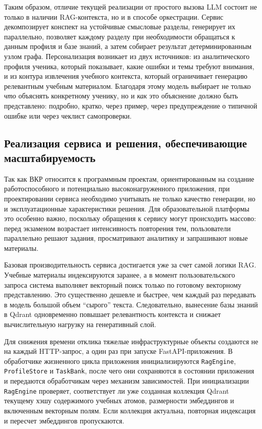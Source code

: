 \documentclass[a4paper,12pt]{extarticle}
\begin{document}
Таким образом, отличие текущей реализации от простого вызова LLM состоит не только
в наличии RAG-контекста, но и в способе оркестрации. Сервис декомпозирует конспект
на устойчивые смысловые разделы, генерирует их параллельно, позволяет каждому
разделу при необходимости обращаться к данным профиля и базе знаний, а затем
собирает результат детерминированным узлом графа. Персонализация возникает из
двух источников: из аналитического профиля ученика, который показывает, какие
ошибки и темы требуют внимания, и из контура извлечения учебного контекста, который ограничивает
генерацию релевантным учебным материалом. Благодаря этому модель выбирает не
только \textit{что} объяснять конкретному ученику, но и \textit{как} это
объяснение должно быть представлено: подробно, кратко, через пример, через
предупреждение о типичной ошибке или через чеклист самопроверки.

\subsection{Реализация сервиса и решения, обеспечивающие масштабируемость}

Так как ВКР относится к программным проектам, ориентированным на создание 
работоспособного и потенциально высоконагруженного приложения, при проектировании 
сервиса необходимо учитывать не только качество генерации, но и эксплуатационные 
характеристики решения. Для образовательной платформы это особенно важно, 
поскольку обращения к сервису могут происходить массово: перед экзаменом возрастает 
интенсивность повторения тем, пользователи параллельно решают задания, просматривают 
аналитику и запрашивают новые материалы.

Базовая производительность сервиса достигается уже за счет самой логики RAG. Учебные 
материалы индексируются заранее, а в момент пользовательского запроса система выполняет 
векторный поиск только по готовому векторному представлению. Это существенно дешевле и быстрее, 
чем каждый раз передавать в модель большой объем ``сырого'' текста. 
Следовательно, вынесение базы знаний в Qdrant одновременно повышает релевантность контекста 
и снижает вычислительную нагрузку на генеративный слой.

Для снижения времени отклика тяжелые инфраструктурные объекты создаются не на каждый
HTTP-запрос, а один раз при запуске FastAPI-приложения. В обработчике жизненного
цикла приложения
инициализируются \texttt{RagEngine}, \texttt{ProfileStore} и \texttt{TaskBank}, после чего
они сохраняются в состоянии приложения и передаются обработчикам через механизм
зависимостей. При инициализации \texttt{RagEngine} проверяет, соответствует ли уже
созданная коллекция Qdrant текущему хэшу содержимого учебных атомов, размерности
эмбеддингов и включенным векторным полям. Если коллекция актуальна, повторная
индексация и пересчет эмбеддингов пропускаются.
\end{document}
